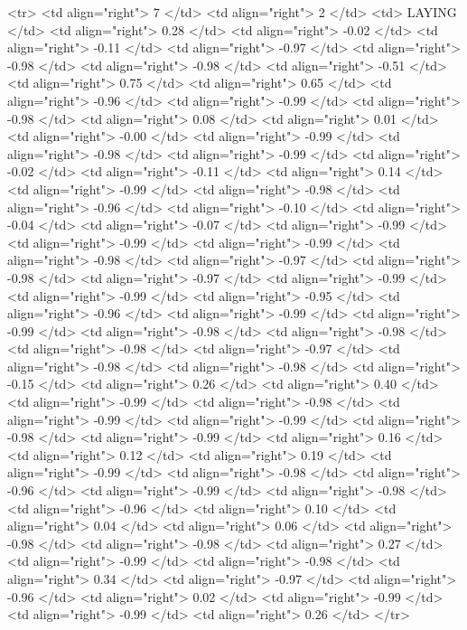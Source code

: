   <tr> <td align="right"> 7 </td> <td align="right">   2 </td> <td> LAYING </td> <td align="right"> 0.28 </td> <td align="right"> -0.02 </td> <td align="right"> -0.11 </td> <td align="right"> -0.97 </td> <td align="right"> -0.98 </td> <td align="right"> -0.98 </td> <td align="right"> -0.51 </td> <td align="right"> 0.75 </td> <td align="right"> 0.65 </td> <td align="right"> -0.96 </td> <td align="right"> -0.99 </td> <td align="right"> -0.98 </td> <td align="right"> 0.08 </td> <td align="right"> 0.01 </td> <td align="right"> -0.00 </td> <td align="right"> -0.99 </td> <td align="right"> -0.98 </td> <td align="right"> -0.99 </td> <td align="right"> -0.02 </td> <td align="right"> -0.11 </td> <td align="right"> 0.14 </td> <td align="right"> -0.99 </td> <td align="right"> -0.98 </td> <td align="right"> -0.96 </td> <td align="right"> -0.10 </td> <td align="right"> -0.04 </td> <td align="right"> -0.07 </td> <td align="right"> -0.99 </td> <td align="right"> -0.99 </td> <td align="right"> -0.99 </td> <td align="right"> -0.98 </td> <td align="right"> -0.97 </td> <td align="right"> -0.98 </td> <td align="right"> -0.97 </td> <td align="right"> -0.99 </td> <td align="right"> -0.99 </td> <td align="right"> -0.95 </td> <td align="right"> -0.96 </td> <td align="right"> -0.99 </td> <td align="right"> -0.99 </td> <td align="right"> -0.98 </td> <td align="right"> -0.98 </td> <td align="right"> -0.98 </td> <td align="right"> -0.97 </td> <td align="right"> -0.98 </td> <td align="right"> -0.98 </td> <td align="right"> -0.15 </td> <td align="right"> 0.26 </td> <td align="right"> 0.40 </td> <td align="right"> -0.99 </td> <td align="right"> -0.98 </td> <td align="right"> -0.99 </td> <td align="right"> -0.99 </td> <td align="right"> -0.98 </td> <td align="right"> -0.99 </td> <td align="right"> 0.16 </td> <td align="right"> 0.12 </td> <td align="right"> 0.19 </td> <td align="right"> -0.99 </td> <td align="right"> -0.98 </td> <td align="right"> -0.96 </td> <td align="right"> -0.99 </td> <td align="right"> -0.98 </td> <td align="right"> -0.96 </td> <td align="right"> 0.10 </td> <td align="right"> 0.04 </td> <td align="right"> 0.06 </td> <td align="right"> -0.98 </td> <td align="right"> -0.98 </td> <td align="right"> 0.27 </td> <td align="right"> -0.99 </td> <td align="right"> -0.98 </td> <td align="right"> 0.34 </td> <td align="right"> -0.97 </td> <td align="right"> -0.96 </td> <td align="right"> 0.02 </td> <td align="right"> -0.99 </td> <td align="right"> -0.99 </td> <td align="right"> 0.26 </td> </tr>
